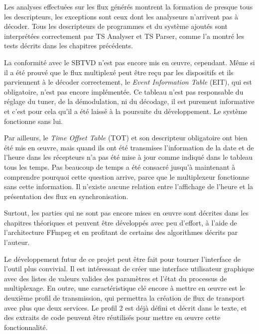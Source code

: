 \documentclass[12pt,a4paper]{article}
\begin{document}
Les analyses effectuées sur les flux générés montrent la formation de presque tous les descripteurs, les exceptions sont ceux dont les analyseurs n'arrivent pas à décoder. Tous les descripteurs de programmes et du système ajoutés sont interprétées correctement par TS Analyser et TS Parser, comme l'a montré les tests décrits dans les chapitres précédents.

La conformité avec le SBTVD n'est pas encore mis en œuvre, cependant. Même si il a été prouvé que le flux multiplexé peut être reçu par les dispositifs et ils parviennent à le décoder correctement, le \textit{Event Information Table} (EIT), qui est obligatoire, n'est pas encore implémentée. Ce tableau n'est pas responsable du réglage du tuner, de la démodulation, ni du décodage, il est purement informative et c'est pour cela qu'il a été laissé à la poursuite du développement. Le système fonctionne sans lui.

Par ailleurs, le \textit{Time Offset Table} (TOT) et son descripteur obligatoire ont bien été mis en œuvre, mais quand ils ont été transmises l'information de la date et de l'heure dans les récepteurs n'a pas été mise à jour comme indiqué dans le tableau tous les temps. Pas beaucoup de temps a été consacré jusqu'à maintenant à comprendre pourquoi cette question arrive, parce que le multiplexeur fonctionne sans cette information. Il n'existe aucune relation entre l'affichage de l'heure et la présentation des flux en synchronisation.

Surtout, les parties qui ne sont pas encore mises en œuvre sont décrites dans les chapitres théoriques et peuvent être développés avec peu d'effort, à l'aide de l'architecture FFmpeg et en profitant de certains des algorithmes décrits par l'auteur.

Le développement futur de ce projet peut être fait pour tourner l'interface de l'outil plus convivial. Il est intéressant de créer une interface utilisateur graphique avec des listes de valeurs valides des paramètres et l'état du processus de multiplexage. En outre, une caractéristique clé encore à mettre en œuvre est le deuxième profil de transmission, qui permettra la création de flux de transport avec plus que deux services. Le profil 2 est déjà défini et décrit dans le texte, et des extraits de code peuvent être réutilisés pour mettre en œuvre cette fonctionnalité.

\appendix
\newpage
{}
\label{resultats}
\end{document}
